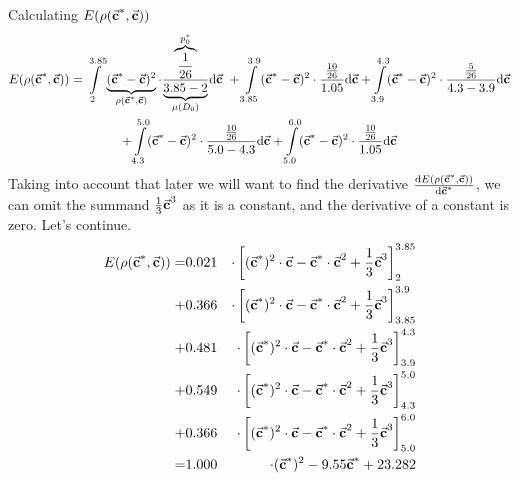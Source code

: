 Calculating $E(\rho(\vec{\textbf{c}}^{*},\vec{\textbf{c}}))$
\begin{gather*}
E(\rho(\vec{\textbf{c}}^{*},\vec{\textbf{c}})) = \int\limits_{2}^{3.85} \underbrace{(\vec{\textbf{c}}^{*}-\vec{\textbf{c}})^{2}}_{\rho(\vec{\textbf{c}}^{*},\vec{\textbf{c}})} \cdot \frac{\overbrace{\frac{1}{26}}^{p_{0}^{*}}}{\underbrace{3.85-2}_{\mu(D_{0})}} \mathrm{d}\vec{\textbf{c}} \ + \int\limits_{3.85}^{3.9} (\vec{\textbf{c}}^{*}-\vec{\textbf{c}})^{2} \cdot \frac{\frac{10}{26}}{1.05} \mathrm{d}\vec{\textbf{c}} + \int\limits_{3.9}^{4.3} (\vec{\textbf{c}}^{*}-\vec{\textbf{c}})^{2} \cdot \frac{\frac{5}{26}}{4.3-3.9} \mathrm{d}\vec{\textbf{c}} \\
+ \int\limits_{4.3}^{5.0} (\vec{\textbf{c}}^{*}-\vec{\textbf{c}})^{2} \cdot \frac{\frac{10}{26}}{5.0-4.3} \mathrm{d}\vec{\textbf{c}} + \int\limits_{5.0}^{6.0} (\vec{\textbf{c}}^{*}-\vec{\textbf{c}})^{2} \cdot \frac{\frac{10}{26}}{1.05}  \mathrm{d}\vec{\textbf{c}}
\end{gather*}
Taking into account that later we will want to find the derivative $\frac{\mathrm{d}E(\rho(\vec{\textbf{c}}^{*},\vec{\textbf{c}}))}{\mathrm{d}\vec{\textbf{c}}^{*}}$, we can omit the summand $\frac{1}{3} \vec{\textbf{c}}^{3}$ as it is a constant, and the derivative of a constant is zero. Let's continue.
\begin{eqnarray*}
E(\rho(\vec{\textbf{c}}^{*},\vec{\textbf{c}})) =& 0.021 & \cdot\left[ (\vec{\textbf{c}}^{*})^{2} \cdot \vec{\textbf{c}} - \vec{\textbf{c}}^{*} \cdot \vec{\textbf{c}}^{2} + \frac{1}{3} \vec{\textbf{c}}^{3}\right]_{2}^{3.85}  \\
+ & 0.366 &\cdot\left[ (\vec{\textbf{c}}^{*})^{2} \cdot \vec{\textbf{c}} - \vec{\textbf{c}}^{*} \cdot \vec{\textbf{c}}^{2} + \frac{1}{3} \vec{\textbf{c}}^{3} \right]_{3.85}^{3.9} \\
+ & 0.481 &\cdot\left[ (\vec{\textbf{c}}^{*})^{2} \cdot \vec{\textbf{c}} - \vec{\textbf{c}}^{*} \cdot \vec{\textbf{c}}^{2} + \frac{1}{3} \vec{\textbf{c}}^{3} \right]_{3.9}^{4.3}  \\
+ & 0.549 &\cdot\left[ (\vec{\textbf{c}}^{*})^{2} \cdot \vec{\textbf{c}} - \vec{\textbf{c}}^{*} \cdot \vec{\textbf{c}}^{2} + \frac{1}{3} \vec{\textbf{c}}^{3} \right]_{4.3}^{5.0}  \\
+ & 0.366 &\cdot\left[ (\vec{\textbf{c}}^{*})^{2} \cdot \vec{\textbf{c}} - \vec{\textbf{c}}^{*} \cdot \vec{\textbf{c}}^{2} + \frac{1}{3} \vec{\textbf{c}}^{3} \right]_{5.0}^{6.0}  \\
= & 1.000 &\cdot(\vec{\textbf{c}}^{*})^{2}-9.55\vec{\textbf{c}}^{*} + 23.282
\end{eqnarray*}

